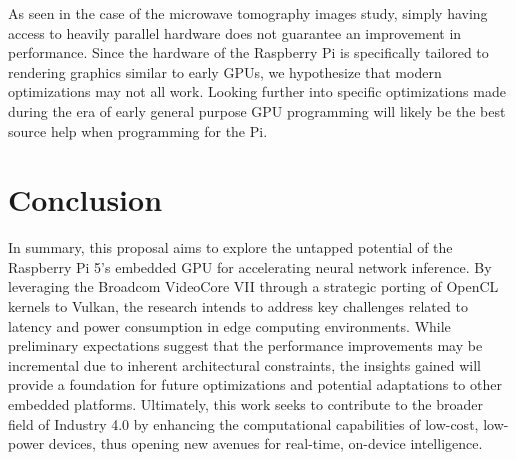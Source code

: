 \documentclass[conference]{IEEEtran}
\begin{document}
 As seen in the case of the microwave tomography images study, simply having access to heavily parallel hardware 
 does not guarantee an improvement in performance. Since the hardware of the Raspberry Pi is specifically tailored 
 to rendering graphics similar to early GPUs, we hypothesize that modern optimizations may not all work. 
 Looking further into specific optimizations made during the era of early general purpose GPU programming will likely
 be the best source help when programming for the Pi. 


 \section{Conclusion}

 In summary, this proposal aims to explore the untapped potential of the Raspberry Pi 5’s embedded GPU for 
 accelerating neural network inference. By leveraging the Broadcom VideoCore VII through a strategic porting 
 of OpenCL kernels to Vulkan, the research intends to address key challenges related to latency and power 
 consumption in edge computing environments. While preliminary expectations suggest that the performance 
 improvements may be incremental due to inherent architectural constraints, the insights gained will provide a 
 foundation for future optimizations and potential adaptations to other embedded platforms. Ultimately, this 
 work seeks to contribute to the broader field of Industry 4.0 by enhancing the computational capabilities of 
 low-cost, low-power devices, thus opening new avenues for real-time, on-device intelligence.
 
 
 
 
 \vspace{12pt}
 
 
\end{document}

